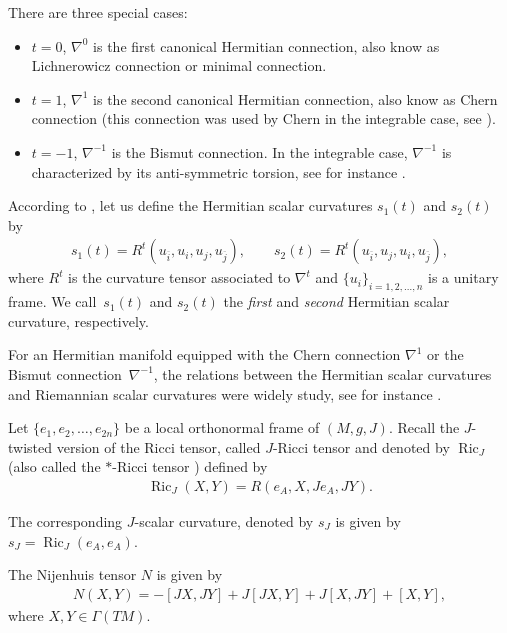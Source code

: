 \documentclass[pdftex]{sigma}%
\numberwithin{equation}{section}
\DeclareMathOperator{\Ric}{Ric}
\begin{document}
There are three special cases:
\begin{itemize}\itemsep=0pt\samepage
\item[$(i)$]$t=0$, $\nabla^{0}$ is the first canonical Hermitian connection, also know as Lichnerowicz connection or minimal connection.

\item[$(ii)$] $t=1$, $\nabla^{1}$ is the second canonical Hermitian connection, also know as Chern connection (this connection was used by Chern in the integrable case, see \cite{ch}).

\item[$(iii)$] $t=-1$, $\nabla^{-1}$ is the Bismut connection. In the integrable case, $\nabla^{-1}$ is characterized by its anti-symmetric torsion, see for instance \cite{ivanov,papa}.
\end{itemize}

According to \cite{fu}, let us define the Hermitian scalar curvatures $s_{1}(t)$ and $s_{2}(t)$ by
\begin{gather*}
s_{1}(t)=R^{t}(u_{\overline{i}},u_{i},u_{j},u_{\overline{j}}),
\qquad
s_{2}(t)=R^{t}(u_{\overline{i}},u_{j},u_{i},u_{\overline{j}}),
\end{gather*}
where $R^{t}$ is the curvature tensor associated to $\nabla^{t}$ and $\{u_{i}\}_{i=1,2,\dots,n}$ is a unitary frame. We call~$s_{1}(t)$ and $s_{2}(t)$ the {\em first} and {\em second} Hermitian scalar curvature, respectively.

For an Hermitian manifold equipped with the Chern connection $\nabla^{1}$ or the Bismut connection~$\nabla^{-1}$, the relations between the Hermitian scalar curvatures and Riemannian scalar curvatures were widely study, see for instance \cite{gau2,liu}.


Let $\{e_{1}, e_{2}, \dots, e_{2n}\}$ be a local orthonormal frame of $(M, g, J)$. Recall the $J$-twisted version of the Ricci tensor, called $J$-Ricci tensor and denoted by $\Ric_J$ (also called the $*$-Ricci tensor \cite{fu,sub,tri}) defined by
\begin{gather*}
\Ric_{J}(X, Y ) = R(e_{A}, X, J e_{A}, JY ).
\end{gather*}

The corresponding $J$-scalar curvature, denoted by $s_{J}$ is given by $s_{J} = \Ric_{J}(e_{A}, e_{A})$.

The Nijenhuis tensor $N$ is given by
\begin{gather*}
N(X,Y)=-[JX,JY]+J[JX,Y]+J[X,JY]+[X,Y],
\end{gather*}
where $X,Y\in \Gamma(TM)$.
\end{document}
